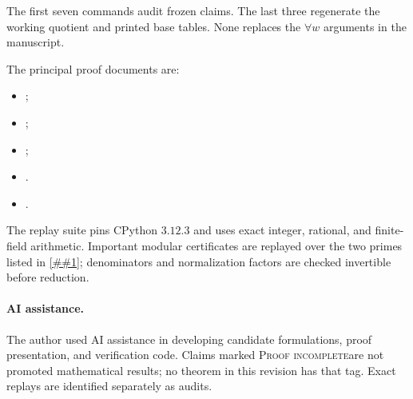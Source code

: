 \documentclass[11pt]{article}
\newcommand{\cref}[1]{\autoref{##1}}%
\newcommand{\claimtag}[1]{\textsc{#1}}
\newcommand{\proofpending}{\claimtag{Proof incomplete}}
\begin{document}
The first seven commands audit frozen claims.  The last three regenerate the
working quotient and printed base tables.  None replaces the \(\forall w\)
arguments in the manuscript.

The principal proof documents are:
\begin{itemize}
\item {};
\item {};
\item {};
\item {}.
\item {}.
\end{itemize}
The replay suite
pins CPython \(3.12.3\) and uses exact integer, rational, and finite-field
arithmetic.  Important modular certificates are replayed over the two primes
listed in \cref{tab:ranks}; denominators and normalization factors are checked
invertible before reduction.

\paragraph{AI assistance.}
The author used AI assistance in developing candidate formulations, proof
presentation, and verification code.  Claims marked \proofpending are not
promoted mathematical results; no theorem in this revision has that tag.
Exact replays are identified separately as audits.



\end{document}
